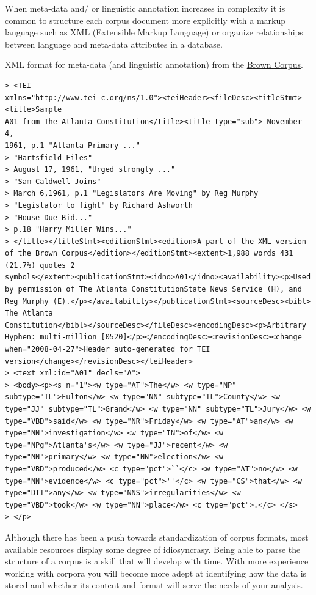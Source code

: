 \documentclass[
  letterpaper,
]{latex/krantz}
\begin{document}
When meta-data and/ or linguistic annotation increases in complexity it
is common to structure each corpus document more explicitly with a
markup language such as XML (Extensible Markup Language) or organize
relationships between language and meta-data attributes in a database.

XML format for meta-data (and linguistic annotation) from the
\href{http://www.nltk.org/nltk_data/}{Brown Corpus}.

\begin{verbatim}
> <TEI
xmlns="http://www.tei-c.org/ns/1.0"><teiHeader><fileDesc><titleStmt><title>Sample
A01 from The Atlanta Constitution</title><title type="sub"> November 4,
1961, p.1 "Atlanta Primary ..."
> "Hartsfield Files"
> August 17, 1961, "Urged strongly ..."
> "Sam Caldwell Joins"
> March 6,1961, p.1 "Legislators Are Moving" by Reg Murphy
> "Legislator to fight" by Richard Ashworth
> "House Due Bid..."
> p.18 "Harry Miller Wins..."
> </title></titleStmt><editionStmt><edition>A part of the XML version
of the Brown Corpus</edition></editionStmt><extent>1,988 words 431
(21.7%) quotes 2
symbols</extent><publicationStmt><idno>A01</idno><availability><p>Used
by permission of The Atlanta ConstitutionState News Service (H), and
Reg Murphy (E).</p></availability></publicationStmt><sourceDesc><bibl>
The Atlanta
Constitution</bibl></sourceDesc></fileDesc><encodingDesc><p>Arbitrary
Hyphen: multi-million [0520]</p></encodingDesc><revisionDesc><change
when="2008-04-27">Header auto-generated for TEI
version</change></revisionDesc></teiHeader>
> <text xml:id="A01" decls="A">
> <body><p><s n="1"><w type="AT">The</w> <w type="NP"
subtype="TL">Fulton</w> <w type="NN" subtype="TL">County</w> <w
type="JJ" subtype="TL">Grand</w> <w type="NN" subtype="TL">Jury</w> <w
type="VBD">said</w> <w type="NR">Friday</w> <w type="AT">an</w> <w
type="NN">investigation</w> <w type="IN">of</w> <w
type="NPg">Atlanta's</w> <w type="JJ">recent</w> <w
type="NN">primary</w> <w type="NN">election</w> <w
type="VBD">produced</w> <c type="pct">``</c> <w type="AT">no</w> <w
type="NN">evidence</w> <c type="pct">''</c> <w type="CS">that</w> <w
type="DTI">any</w> <w type="NNS">irregularities</w> <w
type="VBD">took</w> <w type="NN">place</w> <c type="pct">.</c> </s>
> </p>
\end{verbatim}

Although there has been a push towards standardization of corpus
formats, most available resources display some degree of idiosyncrasy.
Being able to parse the structure of a corpus is a skill that will
develop with time. With more experience working with corpora you will
become more adept at identifying how the data is stored and whether its
content and format will serve the needs of your analysis.
\end{document}
